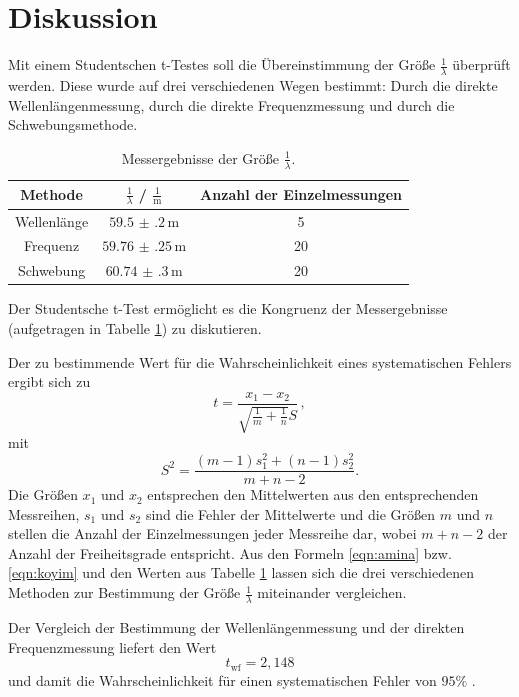 \section{Diskussion}
\label{sec:Diskussion}
Mit einem Studentschen t-Testes soll die Übereinstimmung der Größe $\frac{1}{\lambda}$
überprüft werden. Diese wurde auf drei verschiedenen Wegen bestimmt: Durch die direkte 
Wellenlängenmessung, durch die direkte Frequenzmessung und durch die Schwebungsmethode.

\begin{table}
	\centering
	\caption{Messergebnisse der Größe $\frac{1}{\lambda}$.}
	\label{tab:alam}
	\begin{tabular}{ccc}
		\toprule
		Methode & $\frac{1}{\lambda}$ / $\frac{1}{\si{\meter}}$ & Anzahl der Einzelmessungen \\
		\midrule
		Wellenlänge & $\num{59.5(2)} \, \si{\meter}$ & 5         \\
		Frequenz & $\num{59.76(25)} \, \si{\meter}$ & 20  \\
		Schwebung & $\num{60.74(30)} \, \si{\meter}$ & 20  \\
		\bottomrule
	\end{tabular}
\end{table}
Der Studentsche t-Test ermöglicht es die Kongruenz der Messergebnisse (aufgetragen in Tabelle
\ref{tab:alam}) zu diskutieren.

Der zu bestimmende Wert \cite{ttest} für die  Wahrscheinlichkeit eines systematischen Fehlers 
ergibt sich zu
\begin{equation}
	\label{eqn:amina}
	t = \frac{x_1 - x_2}{\sqrt{\frac{1}{m} + \frac{1}{n}} S} \, \mathrm{,}
\end{equation}
mit 
\begin{equation}
	\label{eqn:koyim}
	S^2 = \frac{(m-1)s_1^2 + (n-1)s_2^2}{m+n-2} \mathrm{.}
\end{equation}
Die Größen $x_1$ und $x_2$ entsprechen den Mittelwerten aus den entsprechenden Messreihen, 
$s_1$ und $s_2$ sind die Fehler der Mittelwerte und die Größen $m$ und $n$ stellen die 
Anzahl der Einzelmessungen jeder Messreihe dar, wobei $m+n-2$ der Anzahl der Freiheitsgrade
entspricht.
Aus den Formeln \eqref{eqn:amina} bzw. \eqref{eqn:koyim} und den Werten aus Tabelle 
\ref{tab:alam} lassen sich die drei verschiedenen Methoden zur Bestimmung der Größe 
$\frac{1}{\lambda}$ miteinander vergleichen.

Der Vergleich der Bestimmung der Wellenlängenmessung und der direkten Frequenzmessung liefert 
den Wert 
\begin{equation*}
	t_{\mathrm{wf}} = 2,148
\end{equation*}
und damit die Wahrscheinlichkeit für einen systematischen Fehler von $95\%$ \cite{tttest}.

